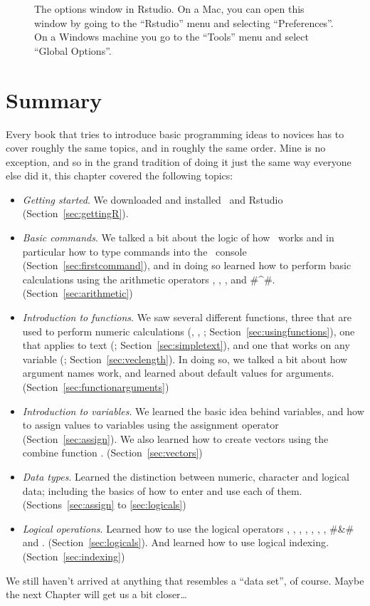 \begin{figure}[t]
\begin{center}
\caption{The options window in Rstudio. On a Mac, you can open this window by going to the ``Rstudio'' menu and selecting ``Preferences''. On a Windows machine you go to the ``Tools'' menu and select ``Global Options''.}
\HR
\label{fig:Rstudiooptions}
\end{center}
\end{figure}

\section{Summary}

Every book that tries to introduce basic programming ideas to novices has to cover roughly the same topics, and in roughly the same order. Mine is no exception, and so in the grand tradition of doing it just the same way everyone else did it, this chapter covered the following topics:

\begin{itemize}
\item {\it Getting started}. We downloaded and installed \R\ and Rstudio (Section~\ref{sec:gettingR}).
\item {\it Basic commands}. We talked a bit about the logic of how \R\ works and in particular how to type commands into the \R\ console (Section~\ref{sec:firstcommand}), and in doing so learned how to perform basic calculations using the arithmetic operators \rtext{+}, \rtext{-}, \rtext{*}, \rtext{/} and \rtextverb#^#. (Section~\ref{sec:arithmetic})
\item {\it Introduction to functions}. We saw several different functions, three that are used to perform numeric calculations (, , ; Section~\ref{sec:usingfunctions}), one that applies to text (; Section~\ref{sec:simpletext}), and one that works on any variable (; Section~\ref{sec:veclength}). In doing so, we talked a bit about  how argument names work, and learned about default values for arguments. (Section~\ref{sec:functionarguments})
\item {\it Introduction to variables}. We learned the basic idea behind variables, and how to assign values to variables using the assignment operator \rtext{<-} (Section~\ref{sec:assign}). We also learned how to create vectors using the combine function . (Section~\ref{sec:vectors}) 
\item {\it Data types}. Learned the distinction between numeric, character and logical data; including the basics of how to enter and use each of them. (Sections~\ref{sec:assign} to \ref{sec:logicals})
\item {\it Logical operations}. Learned how to use the logical operators \rtext{==}, \rtext{!=}, \rtext{<}, \rtext{>}, \rtext{<=}, \rtext{=>}, \rtext{!}, \rtextverb#&# and \rtext{|}. (Section~\ref{sec:logicals}). And learned how to use logical indexing. (Section~\ref{sec:indexing})
\end{itemize}

\noindent
We still haven't arrived at anything that resembles a ``data set'', of course. Maybe the next Chapter will get us a bit closer\ldots





